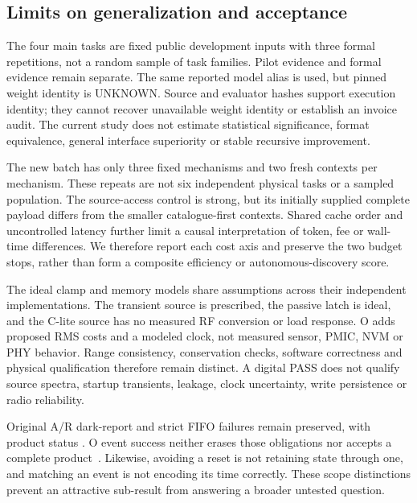 \subsection{Limits on generalization and acceptance}
The four main tasks are fixed public development inputs with three
formal repetitions, not a random sample of task families. Pilot
evidence and formal evidence remain separate. The same reported
model alias is used, but pinned weight identity is UNKNOWN. Source
and evaluator hashes support execution identity; they cannot
recover unavailable weight identity or establish an invoice audit.
The current study does not estimate statistical significance,
format equivalence, general interface superiority or stable
recursive improvement.

The new batch has only three fixed mechanisms and two fresh contexts per
mechanism. These repeats are not six independent physical tasks or a sampled
population. The source-access control is strong, but its initially supplied
complete payload differs from the smaller catalogue-first contexts. Shared
cache order and uncontrolled latency further limit a causal interpretation
of token, fee or wall-time differences. We therefore report each cost axis
and preserve the two budget stops, rather than form a composite efficiency
or autonomous-discovery score.

The ideal clamp and memory models share assumptions across their
independent implementations. The transient source is prescribed,
the passive latch is ideal, and the C-lite source has no measured
RF conversion or load response. O adds proposed RMS costs and a
modeled clock, not measured sensor, PMIC, NVM or PHY behavior.
Range consistency, conservation checks, software correctness and
physical qualification therefore remain distinct. A digital PASS
does not qualify source spectra, startup transients, leakage,
clock uncertainty, write persistence or radio reliability.

Original A/R dark-report and strict FIFO failures remain preserved,
with product status . O event success neither
erases those obligations nor accepts a complete product~\cite{ar}.
Likewise, avoiding a reset is not retaining state through one, and
matching an event is not encoding its time correctly. These scope
distinctions prevent an attractive sub-result from answering a
broader untested question.

